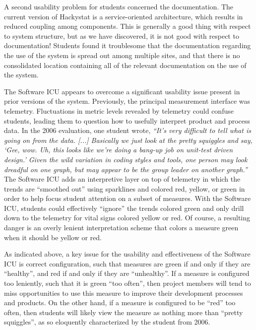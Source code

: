 \documentclass[10pt,twocolumn]{article}
\begin{document}
A second usability problem for students concerned the documentation.  The
current version of Hackystat is a service-oriented architecture, which
results in reduced coupling among components.  This is generally a good
thing with respect to system structure, but as we have discovered, it is
not good with respect to documentation!  Students found it troublesome that
the documentation regarding the use of the system is spread out among
multiple sites, and that there is no consolidated location containing all
of the relevant documentation on the use of the system.

The Software ICU appears to overcome a significant usability issue present
in prior versions of the system. Previously, the principal measurement
interface was telemetry.  Fluctuations in metric levels revealed by
telemetry could confuse students, leading them to question how to usefully
interpret product and process data.  In the 2006 evaluation, one student
wrote, {\em ``It's very difficult to tell what is going on from the
data. [...] Basically we just look at the pretty squiggles and say, `Gee,
wow. Uh, this looks like we're doing a bang-up job on unit-test driven
design.' Given the wild variation in coding styles and tools, one person
may look dreadful on one graph, but may appear to be the group leader on
another graph.''}  The Software ICU adds an interpretive layer on top of
telemetry in which the trends are ``smoothed out'' using sparklines and
colored red, yellow, or green in order to help focus student attention on a
subset of measures.  With the Software ICU, students could effectively
``ignore'' the trends colored green and only drill down to the telemetry
for vital signs colored yellow or red.  Of course, a resulting danger is an
overly lenient interpretation scheme that colors a measure green when it
should be yellow or red.


As indicated above, a key issue for the usability and effectiveness of the
Software ICU is correct configuration, such that measures are green if and
only if they are ``healthy'', and red if and only if they are
``unhealthy''.  If a measure is configured too leniently, such that it is
green ``too often'', then project members will tend to miss opportunities
to use this measure to improve their development processes and products.
On the other hand, if a measure is configured to be ``red'' too often, then
students will likely view the measure as nothing more than ``pretty
squiggles'', as so eloquently characterized by the student from 2006.
\end{document}

